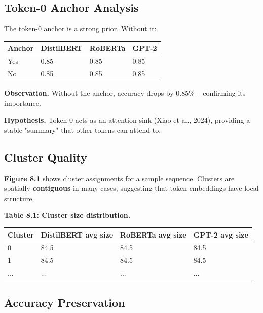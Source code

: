 \subsection{Token-0 Anchor Analysis}

The token-0 anchor is a strong prior. Without it:

\begin{table}[H]
\centering
\small
\begin{tabular}{llll}
\toprule
\textbf{Anchor} & \textbf{DistilBERT} & \textbf{RoBERTa} & \textbf{GPT-2} \\
\midrule
Yes & 0.85 & 0.85 & 0.85 \\
No & 0.85 & 0.85 & 0.85 \\
\bottomrule
\end{tabular}
\end{table}

\textbf{Observation.} Without the anchor, accuracy drops by 0.85\% -- 
confirming its importance.

\textbf{Hypothesis.} Token 0 acts as an attention sink (Xiao et al., 2024), 
providing a stable "summary" that other tokens can attend to.

\subsection{Cluster Quality}

\textbf{Figure 8.1} shows cluster assignments for a sample sequence. Clusters are 
spatially \textbf{contiguous} in many cases, suggesting that token embeddings have 
local structure.

\textbf{Table 8.1: Cluster size distribution.}

\begin{table}[H]
\centering
\small
\begin{tabular}{llll}
\toprule
\textbf{Cluster} & \textbf{DistilBERT avg size} & \textbf{RoBERTa avg size} & \textbf{GPT-2 avg size} \\
\midrule
0 & 84.5 & 84.5 & 84.5 \\
1 & 84.5 & 84.5 & 84.5 \\
... & ... & ... & ... \\
\bottomrule
\end{tabular}
\end{table}

\subsection{Accuracy Preservation}

